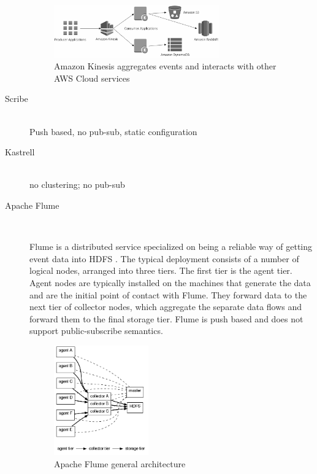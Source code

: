 \begin{description}
{   \begin{figure}[H]
     \centering
     \includegraphics[width=0.7\textwidth]{images/amazon-kinesis.png}
         \caption{Amazon Kinesis aggregates events and interacts with other AWS
         Cloud services \cite{amazonKinesis}}
        \label{fig:amazon-kinesis}
    \end{figure}
    }
    \item [Scribe] \hfill \\
    { Push based, no pub-sub, static configuration}
    \item [Kastrell] \hfill \\
    {no clustering; no pub-sub}
    \item [Apache Flume] \hfill \\
    {Flume is a distributed service specialized on being a reliable way of
    getting event data into HDFS . The typical deployment consists
    of a number of logical nodes, arranged into three tiers. The first tier
    is the agent tier. Agent nodes are typically installed on the machines
    that generate the data and are the initial point of contact with Flume.
    They forward data to the next tier of collector nodes, which aggregate the
    separate data flows and forward them to the final storage tier. Flume is
    push based and does not support public-subscribe semantics. \cite{apacheflumeDoc}
    \begin{figure}[H]
     \centering
     \includegraphics[width=0.4\textwidth]{images/flume-architecture.png}
     \caption{Apache Flume general architecture \cite{apacheflumeDoc}} 
        \label{fig:flume-architecture}
    \end{figure}

    }
\end{description}

